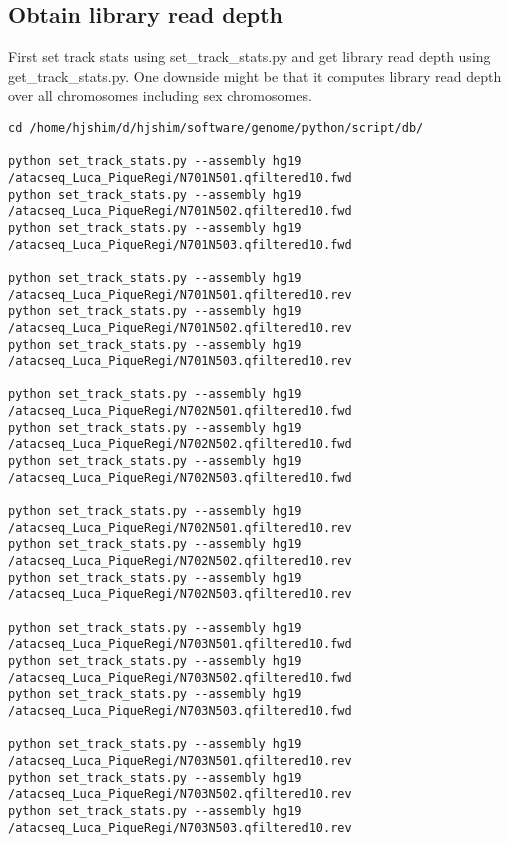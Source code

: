 \documentclass[11pt]{article}
\begin{document}
\subsection{Obtain library read depth}
\label{sec-2-6}
First set track stats using set\_track\_stats.py and get library read depth using get\_track\_stats.py. One downside might be that it computes library read depth over all chromosomes including sex chromosomes.  
\begin{lstlisting}
cd /home/hjshim/d/hjshim/software/genome/python/script/db/

python set_track_stats.py --assembly hg19 /atacseq_Luca_PiqueRegi/N701N501.qfiltered10.fwd
python set_track_stats.py --assembly hg19 /atacseq_Luca_PiqueRegi/N701N502.qfiltered10.fwd
python set_track_stats.py --assembly hg19 /atacseq_Luca_PiqueRegi/N701N503.qfiltered10.fwd

python set_track_stats.py --assembly hg19 /atacseq_Luca_PiqueRegi/N701N501.qfiltered10.rev
python set_track_stats.py --assembly hg19 /atacseq_Luca_PiqueRegi/N701N502.qfiltered10.rev
python set_track_stats.py --assembly hg19 /atacseq_Luca_PiqueRegi/N701N503.qfiltered10.rev

python set_track_stats.py --assembly hg19 /atacseq_Luca_PiqueRegi/N702N501.qfiltered10.fwd
python set_track_stats.py --assembly hg19 /atacseq_Luca_PiqueRegi/N702N502.qfiltered10.fwd
python set_track_stats.py --assembly hg19 /atacseq_Luca_PiqueRegi/N702N503.qfiltered10.fwd

python set_track_stats.py --assembly hg19 /atacseq_Luca_PiqueRegi/N702N501.qfiltered10.rev
python set_track_stats.py --assembly hg19 /atacseq_Luca_PiqueRegi/N702N502.qfiltered10.rev
python set_track_stats.py --assembly hg19 /atacseq_Luca_PiqueRegi/N702N503.qfiltered10.rev

python set_track_stats.py --assembly hg19 /atacseq_Luca_PiqueRegi/N703N501.qfiltered10.fwd
python set_track_stats.py --assembly hg19 /atacseq_Luca_PiqueRegi/N703N502.qfiltered10.fwd
python set_track_stats.py --assembly hg19 /atacseq_Luca_PiqueRegi/N703N503.qfiltered10.fwd

python set_track_stats.py --assembly hg19 /atacseq_Luca_PiqueRegi/N703N501.qfiltered10.rev
python set_track_stats.py --assembly hg19 /atacseq_Luca_PiqueRegi/N703N502.qfiltered10.rev
python set_track_stats.py --assembly hg19 /atacseq_Luca_PiqueRegi/N703N503.qfiltered10.rev


\end{lstlisting}
\end{document}
